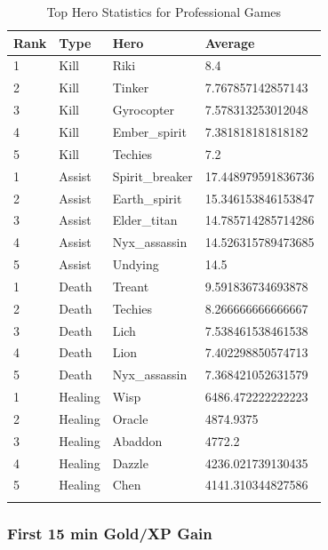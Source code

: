 \documentclass{article}
\begin{document}
\begin{longtable}{|p{1.5cm}|p{2cm}|p{3cm}|p{4.5cm}|}

\hline
\textbf{Rank} & \textbf{Type} & \textbf{Hero} & \textbf{Average} \\
\hline
\endhead

1 & Kill & Riki & 8.4 \\\hline
2 & Kill & Tinker & 7.767857142857143 \\\hline
3 & Kill & Gyrocopter & 7.578313253012048 \\\hline
4 & Kill & Ember\_spirit & 7.381818181818182 \\\hline
5 & Kill & Techies & 7.2 \\\hline
1 & Assist & Spirit\_breaker & 17.448979591836736 \\\hline
2 & Assist & Earth\_spirit & 15.346153846153847 \\\hline
3 & Assist & Elder\_titan & 14.785714285714286 \\\hline
4 & Assist & Nyx\_assassin & 14.526315789473685 \\\hline
5 & Assist & Undying & 14.5 \\\hline
1 & Death & Treant & 9.591836734693878 \\\hline
2 & Death & Techies & 8.266666666666667 \\\hline
3 & Death & Lich & 7.538461538461538 \\\hline
4 & Death & Lion & 7.402298850574713 \\\hline
5 & Death & Nyx\_assassin & 7.368421052631579 \\\hline
1 & Healing & Wisp & 6486.472222222223 \\\hline
2 & Healing & Oracle & 4874.9375 \\\hline
3 & Healing & Abaddon & 4772.2 \\\hline
4 & Healing & Dazzle & 4236.021739130435 \\\hline
5 & Healing & Chen & 4141.310344827586 \\\hline

\caption{Top Hero Statistics for Professional Games}
\label{top-hero-statistics-for-professional-games}
\end{longtable}

\subsubsection{First 15 min Gold/XP Gain}
\end{document}
